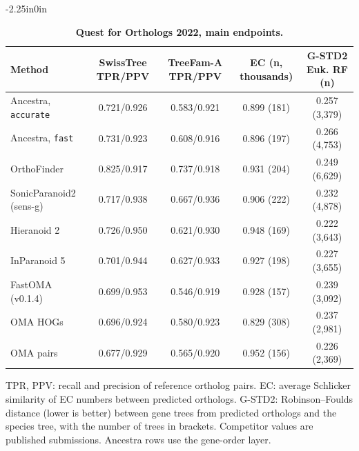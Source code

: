 \begin{table}[!ht]
\begin{adjustwidth}{-2.25in}{0in}
\centering
\caption{{\bf Quest for Orthologs 2022, main endpoints.}}
\begin{tabular}{lcccc}
\hline
Method & SwissTree TPR/PPV & TreeFam-A TPR/PPV & EC (n, thousands) & G-STD2 Euk. RF (n)\\
\hline
Ancestra, \texttt{accurate} & 0.721/0.926 & 0.583/0.921 & 0.899 (181) & 0.257 (3,379)\\
Ancestra, \texttt{fast} & 0.731/0.923 & 0.608/0.916 & 0.896 (197) & 0.266 (4,753)\\
OrthoFinder & 0.825/0.917 & 0.737/0.918 & 0.931 (204) & 0.249 (6,629)\\
SonicParanoid2 (sens-g) & 0.717/0.938 & 0.667/0.936 & 0.906 (222) & 0.232 (4,878)\\
Hieranoid 2 & 0.726/0.950 & 0.621/0.930 & 0.948 (169) & 0.222 (3,643)\\
InParanoid 5 & 0.701/0.944 & 0.627/0.933 & 0.927 (198) & 0.227 (3,655)\\
FastOMA (v0.1.4) & 0.699/0.953 & 0.546/0.919 & 0.928 (157) & 0.239 (3,092)\\
OMA HOGs & 0.696/0.924 & 0.580/0.923 & 0.829 (308) & 0.237 (2,981)\\
OMA pairs & 0.677/0.929 & 0.565/0.920 & 0.952 (156) & 0.226 (2,369)\\
\hline
\end{tabular}
\begin{flushleft}TPR, PPV: recall and precision of reference ortholog pairs. EC: average Schlicker similarity of EC numbers between predicted orthologs. G-STD2: Robinson--Foulds distance (lower is better) between gene trees from predicted orthologs and the species tree, with the number of trees in brackets. Competitor values are published submissions. Ancestra rows use the gene-order layer.
\end{flushleft}
\label{tab:qfo}
\end{adjustwidth}
\end{table}

